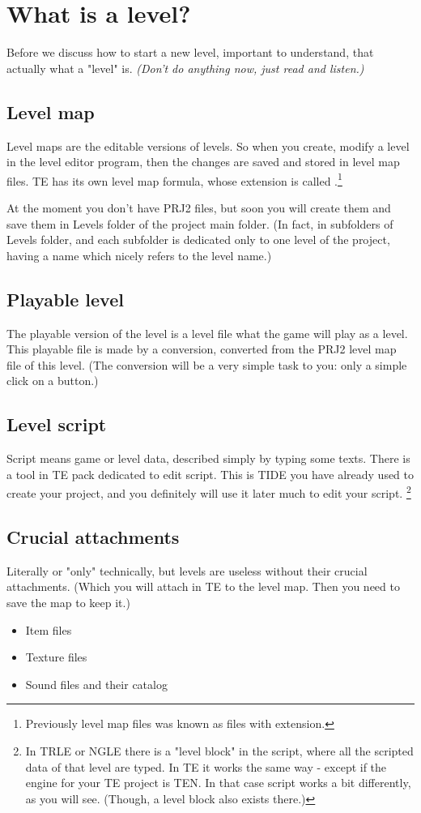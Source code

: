 \chapter{What is a level?}
Before we discuss how to start a new level, important to understand, that actually what a "level" is.
\emph{(Don't do anything now, just read and listen.)}
\section{Level map}
Level maps are the editable versions of levels. So when you create, modify a level in the level editor program, then the changes are saved and stored in level map files.
 TE has its own level map formula, whose extension is called .\footnote{Previously level map files was known as files with  extension.}
 \par At the moment you don't have PRJ2 files, but soon you will create them and save them in Levels folder of the project main folder. (In fact, in subfolders of Levels folder, and each subfolder is dedicated only to one level of the project, having a name which nicely refers to the level name.)
 \section{Playable level}
 The playable version of the level is a level file what the game will play as a level. This playable file is made by a conversion, converted from the PRJ2 level map file of this level. (The conversion will be a very simple task to you: only a simple click on a button.)
 \section{Level script}
Script means game or level data, described simply by typing some texts.
There is a tool in TE pack dedicated to edit script. This is TIDE you have already used to create your project, and you definitely will use it later much to edit your script. \footnote{In TRLE or NGLE there is a "level block" in the script, where all the scripted data of that level are typed. In TE it works the same way - except if the engine for your TE project is TEN. In that case script works a bit differently, as you will see. (Though, a level block also exists there.)}
 \section{Crucial attachments}
 Literally or "only" technically, but levels are useless without their crucial attachments. (Which you will attach in TE to the level map. Then you need to save the map to keep it.)
\begin{itemize}
    \item Item files
    \item Texture files
    \item Sound files and their catalog
\end{itemize}
